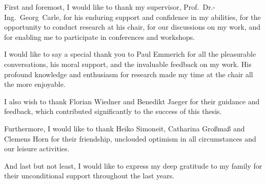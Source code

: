 \small

First and foremost, I would like to thank my supervisor,
Prof.~Dr.-Ing.~Georg~Carle, for his enduring support and confidence in my
abilities, for the opportunity to conduct research at his chair, for our
discussions on my work, and for enabling me to participate in conferences and
workshops.

I would like to say a special thank you to Paul Emmerich for all the pleasurable
conversations, his moral support, and the invaluable feedback on my work. His
profound knowledge and enthusiasm for research made my time at the chair all the
more enjoyable.

I also wish to thank Florian Wiedner and Benedikt Jaeger for their guidance and
feedback, which contributed significantly to the success of this thesis.

Furthermore, I would like to thank Heiko Simoneit, Catharina Großmaß and Clemens
Horn for their friendship, unclouded optimism in all circumstances and our
leisure activities.

And last but not least, I would like to express my deep gratitude to my family
for their unconditional support throughout the last years.

